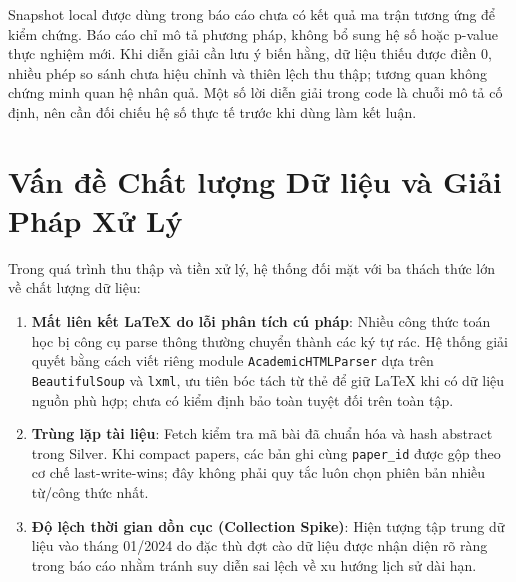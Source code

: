Snapshot local được dùng trong báo cáo chưa có kết quả ma trận tương ứng để kiểm chứng. Báo cáo chỉ mô tả phương pháp, không bổ sung hệ số hoặc p-value thực nghiệm mới. Khi diễn giải cần lưu ý biến hằng, dữ liệu thiếu được điền 0, nhiều phép so sánh chưa hiệu chỉnh và thiên lệch thu thập; tương quan không chứng minh quan hệ nhân quả. Một số lời diễn giải trong code là chuỗi mô tả cố định, nên cần đối chiếu hệ số thực tế trước khi dùng làm kết luận.

\section{Vấn đề Chất lượng Dữ liệu và Giải Pháp Xử Lý}

Trong quá trình thu thập và tiền xử lý, hệ thống đối mặt với ba thách thức lớn về chất lượng dữ liệu:
\begin{enumerate}[label=\textbf{\arabic*.}]
  \item \textbf{Mất liên kết LaTeX do lỗi phân tích cú pháp}: Nhiều công thức toán học bị công cụ parse thông thường chuyển thành các ký tự rác. Hệ thống giải quyết bằng cách viết riêng module \texttt{AcademicHTMLParser} dựa trên \texttt{BeautifulSoup} và \texttt{lxml}, ưu tiên bóc tách từ thẻ  để giữ LaTeX khi có dữ liệu nguồn phù hợp; chưa có kiểm định bảo toàn tuyệt đối trên toàn tập.
  \item \textbf{Trùng lặp tài liệu}: Fetch kiểm tra mã bài đã chuẩn hóa và hash abstract trong Silver. Khi compact papers, các bản ghi cùng \texttt{paper\_id} được gộp theo cơ chế last-write-wins; đây không phải quy tắc luôn chọn phiên bản nhiều từ/công thức nhất.
  \item \textbf{Độ lệch thời gian dồn cục (Collection Spike)}: Hiện tượng tập trung dữ liệu vào tháng 01/2024 do đặc thù đợt cào dữ liệu được nhận diện rõ ràng trong báo cáo nhằm tránh suy diễn sai lệch về xu hướng lịch sử dài hạn.
\end{enumerate}
